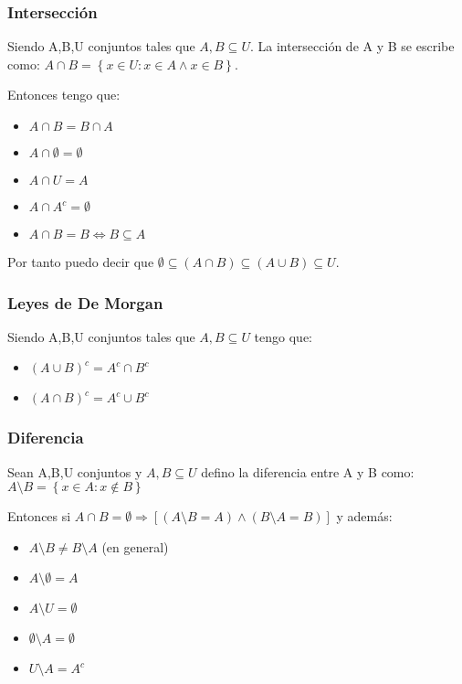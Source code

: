 \documentclass{report}
\begin{document}
\subsubsection{Intersección}
Siendo A,B,U conjuntos tales que $A,B \subseteq U$. La intersección de A y B se escribe como: \begin{math}
    A \cap B = \left\{x\in U: x \in A \land x \in B\right\}
\end{math}. 

Entonces tengo que: \begin{itemize}
    \item $A \cap B = B \cap A$
    \item $A \cap \emptyset = \emptyset$
    \item $A \cap U = A$
    \item $A \cap A^c=\emptyset$
    \item $A \cap B = B \iff B \subseteq A$
\end{itemize} 

Por tanto puedo decir que \begin{math}
    \emptyset \subseteq (A \cap B) \subseteq (A \cup B) \subseteq U 
\end{math}.
\subsubsection{Leyes de De Morgan}
Siendo A,B,U conjuntos tales que $A,B \subseteq U$ tengo que: \begin{itemize}
    \item \begin{math}
        (A \cup B)^c = A^c \cap B^c
    \end{math}
    \item \begin{math}
        (A \cap B)^c = A^c \cup B^c
    \end{math}
\end{itemize}
\subsubsection{Diferencia}
Sean A,B,U conjuntos y $A,B \subseteq U$ defino la diferencia entre A y B como: \begin{math}
    A \setminus B = \left\{x\in A: x \notin B\right\}
\end{math}

Entonces si $A \cap B = \emptyset \Rightarrow [(A \setminus B = A) \land (B \setminus A = B)]$ y además: \begin{itemize}
    \item $A \setminus B \neq B \setminus A$ (en general)
    \item $A \setminus \emptyset = A$
    \item $A \setminus U = \emptyset$
    \item $\emptyset \setminus A = \emptyset$
    \item $U \setminus A = A^c$
\end{itemize} 
\end{document}
